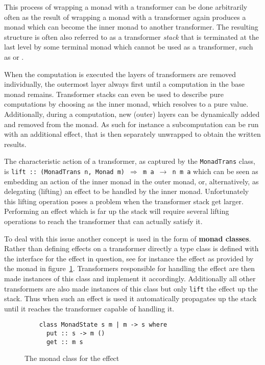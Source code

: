 This process of wrapping a monad with a transformer can be done arbitrarily
often as the result of wrapping a monad with a transformer again produces a
monad which can become the inner monad to another transformer. The resulting
structure is often also referred to as a transformer \emph{stack} that is
terminated at the last level by some terminal monad which cannot be used as a
transformer, such as \IOM{} or \HandlerForM{}.

When the computation is executed the layers of transformers are removed
individually, the outermost layer always first until a computation in the base
monad remains. Transformer stacks can even be used to describe pure computations
by choosing \IdentityM{} as the inner monad, which resolves to a pure value.
Additionally, during a computation, new (outer) layers can be dynamically added
and removed from the monad. As such for instance a subcomputation can be run
with an additional \WriterM{} effect, that is then separately unwrapped to
obtain the written results.

The characteristic action of a transformer, as captured by the
\texttt{MonadTrans} class, is \texttt{lift :: (MonadTrans n, Monad m)
  $\Rightarrow$ m a $\rightarrow$ n m a} which can be seen as embedding an
action of the inner monad in the outer monad, or, alternatively, as delegating
(lifting) an effect to be handled by the inner monad. Unfortunately this lifting
operation poses a problem when the transformer stack get larger. Performing an
effect which is far up the stack will require several lifting operations to
reach the transformer that can actually satisfy it.

To deal with this issue another concept is used in the form of \textbf{monad
  classes}. Rather than defining effects on a transformer directly a type class
is defined with the interface for the effect in question, see for instance the
effect as provided by the \StateM{} monad in
figure~\ref{fig:monad-class-example}. Transformers responsible for handling the
effect are then made instances of this class and implement it accordingly.
Additionally all other transformers are also made instances of this class but
only \texttt{lift} the effect up the stack. Thus when such an effect is used it
automatically propagates up the stack until it reaches the transformer capable
of handling it.

\begin{figure}
  \begin{lstlisting}
    class MonadState s m | m -> s where
      put :: s -> m ()
      get :: m s
  \end{lstlisting}
  \caption{The monad class for the \StateM{} effect}
  \label{fig:monad-class-example}
\end{figure}

